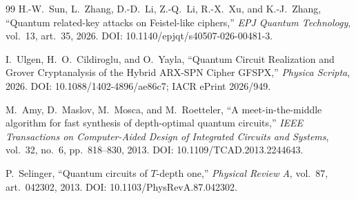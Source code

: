 \documentclass[pdflatex,sn-nature]{sn-jnl}
\theoremstyle{thmstyleone}
\theoremstyle{thmstyletwo}
\begin{document}
\begin{thebibliography}{99}
H.-W.~Sun, L.~Zhang, D.-D.~Li, Z.-Q.~Li, R.-X.~Xu, and K.-J.~Zhang,
``Quantum related-key attacks on Feistel-like ciphers,''
\emph{EPJ Quantum Technology}, vol.~13, art.~35, 2026.
DOI: 10.1140/epjqt/s40507-026-00481-3.

I.~Ulgen, H.~O.~Cildiroglu, and O.~Yayla,
``Quantum Circuit Realization and Grover Cryptanalysis of the Hybrid ARX-SPN Cipher GFSPX,''
\emph{Physica Scripta}, 2026.
DOI: 10.1088/1402-4896/ae86c7; IACR ePrint 2026/949.

M.~Amy, D.~Maslov, M.~Mosca, and M.~Roetteler,
``A meet-in-the-middle algorithm for fast synthesis of depth-optimal quantum circuits,''
\emph{IEEE Transactions on Computer-Aided Design of Integrated Circuits and Systems},
vol.~32, no.~6, pp.~818--830, 2013.
DOI: 10.1109/TCAD.2013.2244643.

P.~Selinger,
``Quantum circuits of $T$-depth one,''
\emph{Physical Review A}, vol.~87, art.~042302, 2013.
DOI: 10.1103/PhysRevA.87.042302.

\end{thebibliography}
\end{document}
